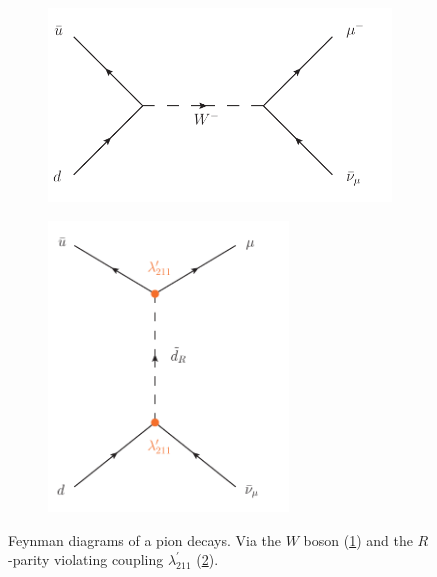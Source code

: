 \begin{figure}[!htb]
  \centering
  \begin{subfigure}[b]{0.495\textwidth}
    \centering
    \includegraphics[width=\textwidth]{plots/pion-decay.pdf}
    \caption{\label{fig:pion-decay}}
  \end{subfigure}
  \begin{subfigure}[b]{0.495\textwidth}
    \centering
    \includegraphics[width=0.7\textwidth]{plots/pion-lambda-prime-211.pdf}
    \caption{\label{fig:pion-lambda-prime-211}}
  \end{subfigure}

  \caption{Feynman diagrams of a pion decays. Via the $W$ boson (\ref{fig:pion-decay}) and the $R$-parity violating coupling $\lambda^\prime_{211}$ (\ref{fig:pion-lambda-prime-211}).}
  \label{fig:pion-decays}
\end{figure}

